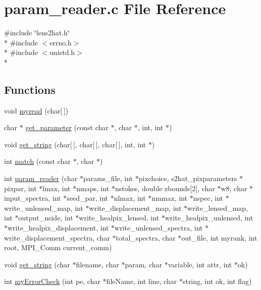 \section{param\-\_\-reader.\-c File Reference}
\label{derivatives__nersc_2param__reader_8c}
{\ttfamily \#include \char`\"{}lens2hat.\-h\char`\"{}}\\*
{\ttfamily \#include $<$errno.\-h$>$}\\*
{\ttfamily \#include $<$unistd.\-h$>$}\\*
\subsection*{Functions}
\begin{DoxyCompactItemize}
\item 
void \hyperlink{derivatives__nersc_2param__reader_8c_a50c0568f618886d78986c4a9d6a23ba4}{myread} (char\mbox{[}$\,$\mbox{]})
\item 
char $\ast$ \hyperlink{derivatives__nersc_2param__reader_8c_ab3cc75c29a38da58b8a99b6f65096891}{get\-\_\-parameter} (const char $\ast$, char $\ast$, int, int $\ast$)
\item 
void \hyperlink{derivatives__nersc_2param__reader_8c_acdf8e6c6f50db79679922d3dbf74dd84}{get\-\_\-string} (char\mbox{[}$\,$\mbox{]}, char\mbox{[}$\,$\mbox{]}, char\mbox{[}$\,$\mbox{]}, int, int $\ast$)
\item 
int \hyperlink{derivatives__nersc_2param__reader_8c_af71971b64e93dd85136d531400035e57}{match} (const char $\ast$, char $\ast$)
\item 
int \hyperlink{derivatives__nersc_2param__reader_8c_ab6bacb8b57a4a9612bd4d7a8ec68dfb9}{param\-\_\-reader} (char $\ast$params\-\_\-file, int $\ast$pixchoice, s2hat\-\_\-pixparameters $\ast$pixpar, int $\ast$lmax, int $\ast$nmaps, int $\ast$nstokes, double zbounds\mbox{[}2\mbox{]}, char $\ast$w8, char $\ast$input\-\_\-spectra, int $\ast$seed\-\_\-par, int $\ast$nlmax, int $\ast$nmmax, int $\ast$nspec, int $\ast$write\-\_\-unlensed\-\_\-map, int $\ast$write\-\_\-displacement\-\_\-map, int $\ast$write\-\_\-lensed\-\_\-map, int $\ast$output\-\_\-nside, int $\ast$write\-\_\-healpix\-\_\-lensed, int $\ast$write\-\_\-healpix\-\_\-unlensed, int $\ast$write\-\_\-healpix\-\_\-displacement, int $\ast$write\-\_\-unlensed\-\_\-spectra, int $\ast$write\-\_\-displacement\-\_\-spectra, char $\ast$total\-\_\-spectra, char $\ast$out\-\_\-file, int myrank, int root, M\-P\-I\-\_\-\-Comm current\-\_\-comm)
\item 
void \hyperlink{derivatives__nersc_2param__reader_8c_a1be51b19c79f5c49c6ce2128259fc093}{get\-\_\-string} (char $\ast$filename, char $\ast$param, char $\ast$variable, int attr, int $\ast$ok)
\item 
int \hyperlink{derivatives__nersc_2param__reader_8c_a70bcbd531a6e4abc62d73f5b4532c2cc}{my\-Error\-Check} (int pe, char $\ast$file\-Name, int line, char $\ast$string, int ok, int flag)
\end{DoxyCompactItemize}


